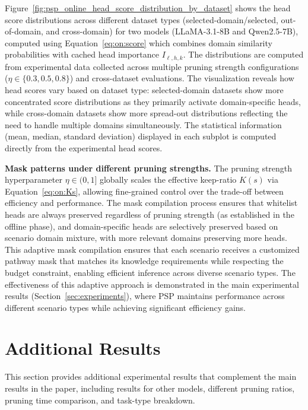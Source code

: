 Figure~\ref{fig:psp_online_head_score_distribution_by_dataset} shows the head score distributions across different dataset types (selected-domain/selected, out-of-domain, and cross-domain) for two models (LLaMA-3.1-8B and Qwen2.5-7B), computed using Equation~\eqref{eq:on:score} which combines domain similarity probabilities with cached head importance $I_{\ell,h,k}$.
The distributions are computed from experimental data collected across multiple pruning strength configurations ($\eta \in \{0.3, 0.5, 0.8\}$) and cross-dataset evaluations.
The visualization reveals how head scores vary based on dataset type: selected-domain datasets show more concentrated score distributions as they primarily activate domain-specific heads, while cross-domain datasets show more spread-out distributions reflecting the need to handle multiple domains simultaneously.
The statistical information (mean, median, standard deviation) displayed in each subplot is computed directly from the experimental head scores.

\textbf{Mask patterns under different pruning strengths.}
The pruning strength hyperparameter $\eta \in (0,1]$ globally scales the effective keep-ratio $K(s)$ via Equation~\eqref{eq:on:Ks}, allowing fine-grained control over the trade-off between efficiency and performance.
The mask compilation process ensures that whitelist heads are always preserved regardless of pruning strength (as established in the offline phase), and domain-specific heads are selectively preserved based on scenario domain mixture, with more relevant domains preserving more heads.
This adaptive mask compilation ensures that each scenario receives a customized pathway mask that matches its knowledge requirements while respecting the budget constraint, enabling efficient inference across diverse scenario types.
The effectiveness of this adaptive approach is demonstrated in the main experimental results (Section~\ref{sec:experiments}), where PSP maintains performance across different scenario types while achieving significant efficiency gains.


\section{Additional Results}
\label{app:additional_results}

This section provides additional experimental results that complement the main results in the paper, including results for other models, different pruning ratios, pruning time comparison, and task-type breakdown.

